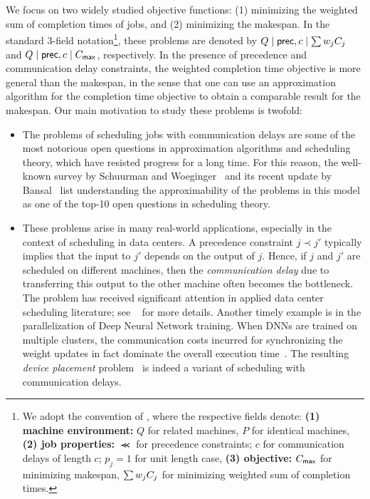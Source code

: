  \medskip
  We focus on two widely studied objective functions: (1) minimizing the weighted sum of completion times of jobs, and (2) minimizing the makespan.
  In the standard 3-field notation\footnote{
  We adopt the convention of \cite{GLLR79,VeltmanLL90}, where the respective fields denote:
      \textbf{(1) machine environment:} $Q$ for related machines, $P$ for identical machines,
      \textbf{(2) job properties:} $\Prec$ for precedence constraints; $c$ for communication delays of length $c$; $p_j = 1$ for unit length case,
      \textbf{(3) objective:} $C_{\mathsf{max}}$ for minimizing makespan, $\sum w_j C_j$ for minimizing weighted sum of completion times.
  },
  these problems are denoted by $Q \mid \mathsf{prec}, c \mid \sum w_j C_j$ and $Q  \mid \mathsf{prec}, c \mid C_{\mathsf{max}}$, respectively.
  In the presence of precedence and communication delay constraints, the weighted completion time objective is more general than the makespan, in the sense that one can use an approximation algorithm for the completion time objective to obtain a comparable result for the makespan.
  Our main motivation to study these problems is twofold:
  \begin{itemize}
  \item The problems of scheduling jobs with communication delays are some of the most notorious open questions in approximation algorithms and scheduling theory, which have resisted progress for a long time.  For this reason, the well-known survey by  Schuurman and Woeginger~\cite{SW99a} and its recent update by Bansal~\cite{Bansalmapsp} list understanding the approximability of the problems in this model as one of the top-10 open questions in scheduling theory.
  \item These problems arise in many real-world applications,  especially in the context of scheduling in data centers.
  A precedence constraint $j \prec j'$ typically implies that the input to $j'$ depends on the output of $j$.
  Hence, if $j$ and $j'$ are scheduled on different machines, then the {\em communication delay} due to transferring this output to the other machine often becomes the bottleneck.
  The problem has received significant attention in applied data center scheduling literature; see ~\cite{Chowdhury, guo2012spotting,hong2012finishing,shymyrbay2018meeting,zhang2012optimizing,zhao2015rapier,luo2016towards} for more details.
   Another timely  example is in the parallelization of Deep Neural Network training. When DNNs are trained on multiple clusters, the communication costs incurred for synchronizing the weight updates in fact dominate the overall execution time~\cite{narayanan2018pipedream}.
  The resulting \emph{device placement} problem~\cite{dean2017rlplacement,spotlight2018,jia2018beyond,tarnawski2020efficient}  is indeed a variant of scheduling with communication delays.
  \end{itemize}
  
